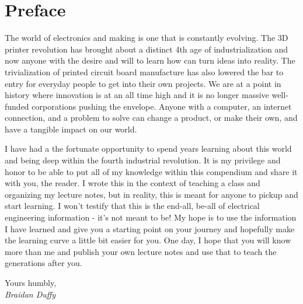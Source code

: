\chapter*{Preface}

The world of electronics and making is one that is constantly evolving.
The 3D printer revolution has brought about a distinct 4th age of industrialization and now anyone with the desire and will to learn how can turn ideas into reality.
The trivialization of printed circuit board manufacture has also lowered the bar to entry for everyday people to get into their own projects.
We are at a point in history where innovation is at an all time high and it is no longer massive well-funded corporations pushing the envelope.
Anyone with a computer, an internet connection, and a problem to solve can change a product, or make their own, and have a tangible impact on our world.

I have had a the fortunate opportunity to spend years learning about this world and being deep within the fourth industrial revolution.
It is my privilege and honor to be able to put all of my knowledge within this compendium and share it with you, the reader.
I wrote this in the context of teaching a class and organizing my lecture notes, but in reality, this is meant for anyone to pickup and start learning.
I won't testify that this is the end-all, be-all of electrical engineering information - it's not meant to be!
My hope is to use the information I have learned and give you a starting point on your journey and hopefully make the learning curve a little bit easier for you.
One day, I hope that you will know more than me and publish your own lecture notes and use that to teach the generations after you.

\begin{flushright}
	Yours humbly,\\
	\textit{Braidan Duffy}
\end{flushright}
